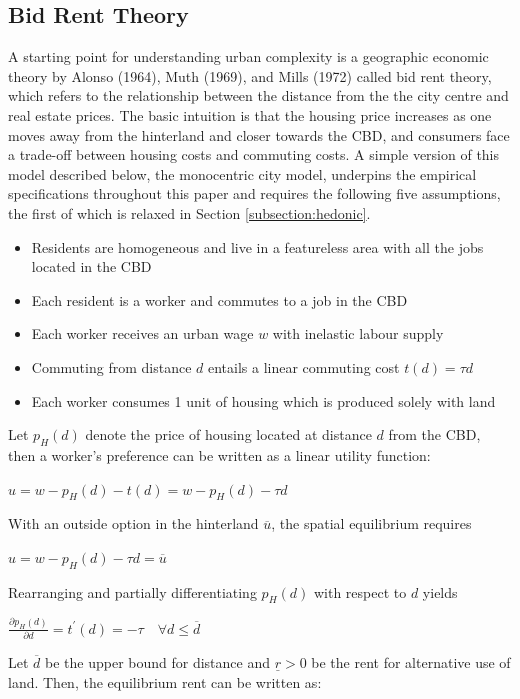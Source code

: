 \documentclass{article}
\begin{document}
\subsection{Bid Rent Theory} \label{subsection:monocentric}
A starting point for understanding urban complexity is a geographic economic theory by Alonso (1964), Muth (1969), and Mills (1972) called bid rent theory, which refers to the relationship between the distance from the the city centre and real estate prices. The basic intuition is that the housing price increases as one moves away from the hinterland and closer towards the CBD, and consumers face a trade-off between housing costs and commuting costs. A simple version of this model described below, the monocentric city model, underpins the empirical specifications throughout this paper and requires the following five assumptions, the first of which is relaxed in Section \ref{subsection:hedonic}.
\begin{itemize}
\setlength\itemsep{0.1em}
\item Residents are homogeneous and live in a featureless area with all the jobs located in the CBD
\item Each resident is a worker and commutes to a job in the CBD
\item Each worker receives an urban wage $w$ with inelastic labour supply
\item Commuting from distance $d$ entails a linear commuting cost $t(d) = \tau d$
\item Each worker consumes 1 unit of housing which is produced solely  with land
\end{itemize}
Let $p_H (d)$ denote the price of housing located at distance $d$ from the CBD, then a worker's preference can be written as a linear utility function:
\begin{center}
$u = w - p _ { H } ( d ) - t ( d ) = w - p _ { H } ( d ) - \tau d$
\end{center}
With an outside option in the hinterland $\overline{u}$, the spatial equilibrium requires
\begin{center}
$u = w - p _ { H } ( d ) - \tau d = \overline { u }$
\end{center}
Rearranging and partially differentiating $p_H (d)$ with respect to $d$ yields 
\begin{center}
$\frac { \partial p _ { H } ( d ) } { \partial d } = t ^ { \prime } ( d ) = - \tau \quad \forall d \leq \overline { d }$
\end{center}
Let $\overline{d}$ be the upper bound for distance and $\underline{r} > 0$ be the rent for alternative use of land. Then, the equilibrium rent can be written as:
\end{document}
